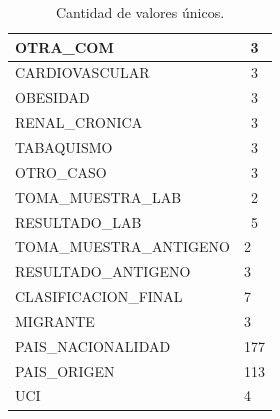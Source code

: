 \begin{table}[h]
{\begin{tabular}{|l|c|}
OTRA\_COM               & 3                        \\ \hline
CARDIOVASCULAR          & 3                        \\ \hline
OBESIDAD                & 3                        \\ \hline
RENAL\_CRONICA          & 3                        \\ \hline
TABAQUISMO              & 3                        \\ \hline
OTRO\_CASO              & 3                        \\ \hline
TOMA\_MUESTRA\_LAB      & 2                        \\ \hline
RESULTADO\_LAB          & 5                        \\ \hline
TOMA\_MUESTRA\_ANTIGENO & \multicolumn{1}{l|}{2}   \\ \hline
RESULTADO\_ANTIGENO     & \multicolumn{1}{l|}{3}   \\ \hline
CLASIFICACION\_FINAL    & \multicolumn{1}{l|}{7}   \\ \hline
MIGRANTE                & \multicolumn{1}{l|}{3}   \\ \hline
PAIS\_NACIONALIDAD      & \multicolumn{1}{l|}{177} \\ \hline
PAIS\_ORIGEN            & \multicolumn{1}{l|}{113} \\ \hline
UCI                     & \multicolumn{1}{l|}{4}   \\ \hline
\end{tabular}
}
\caption{Cantidad de valores únicos.}
\label{tabla:autores}
\end{table}

